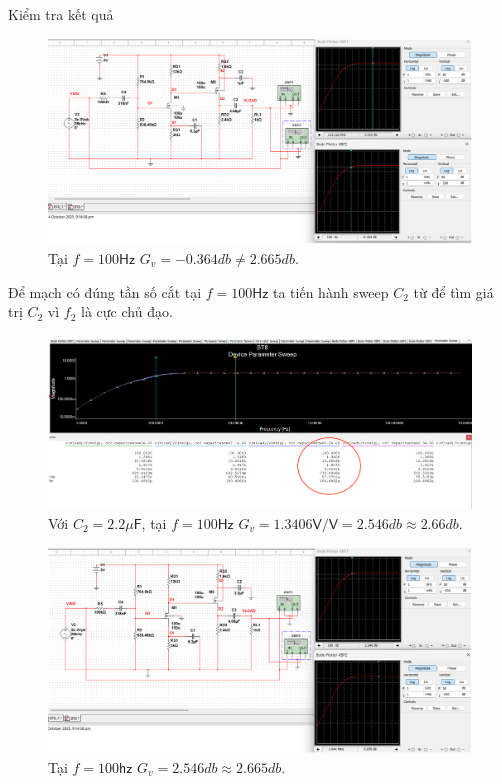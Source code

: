 Kiểm tra kết quả

\begin{figure}[H]
	\centering
	\includegraphics[width=.8\linewidth]{./my-chapters/my-images/Question8/d_ketqua1.png}
	\caption{Tại $f = 100 \textsf{Hz}$ $G_{v} = -0.364 db \neq 2.665 db$.}
\end{figure}

Để mạch có đúng tần số cắt tại $f = 100 \textsf{Hz}$ ta tiến hành sweep $C_{2}$ từ để tìm giá trị $C_{2}$ vì $f_{2}$ là cực chủ đạo.

\begin{figure}[H]
	\centering
	\includegraphics[width=.9\linewidth]{./my-chapters/my-images/Question8/d_ketqua2.png}
	\caption{Với $C_{2} = 2.2 \mu\textsf{F}$, tại $f = 100 \textsf{Hz}$ $G_{v} = 1.3406 \textsf{V/V} = 2.546db \approx 2.66db$.}
\end{figure}

\begin{figure}[H]
	\centering
	\includegraphics[width=.9\linewidth]{./my-chapters/my-images/Question8/d_ketqua3.png}
	\caption{Tại $f = 100 \textsf{hz}$ $G_{v} = 2.546 db \approx 2.665 db$.}
\end{figure}